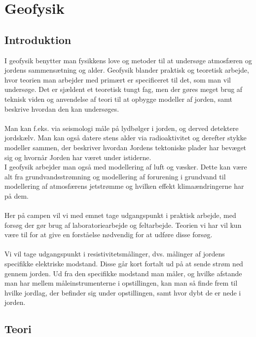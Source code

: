 \chapter{Geofysik}

\section{Introduktion}
I geofysik benytter man fysikkens love og metoder til at undersøge atmosfæren og jordens sammensætning og alder. Geofysik blander praktisk og teoretisk arbejde, hvor teorien man arbejder med primært er specificeret til det, som man vil undersøge. Det er sjældent et teoretisk tungt fag, men der gøres meget brug af teknisk viden og anvendelse af teori til at opbygge modeller af jorden, samt beskrive hvordan den kan undersøges.\\ \\
%
%
Man kan f.eks. via seismologi måle på lydbølger i jorden, og derved detektere jordskælv. Man kan også datere stens alder via radioaktivitet og derefter stykke modeller sammen, der beskriver hvordan Jordens tektoniske plader har bevæget sig og hvornår Jorden har været under istiderne.\\
%
I geofysik arbejder man også med modellering af luft og væsker. Dette kan være alt fra grundvandsstrømning og modellering af forurening i grundvand til modellering af atmosfærens jetstrømme og hvilken effekt klimaændringerne har på dem. \\ \\
%
%
Her på campen vil vi med emnet tage udgangspunkt i praktisk arbejde, med forsøg der gør brug af laboratoriearbejde og feltarbejde. Teorien vi har vil kun være til for at give en forståelse nødvendig for at udføre disse forsøg. \\ \\
%
%
Vi vil tage udgangspunkt i resistivitetsmålinger, dvs. målinger af jordens specifikke elektriske modstand. Disse går kort fortalt ud på at sende strøm ned gennem jorden. Ud fra den specifikke modstand man måler, og hvilke afstande man har mellem måleinstrumenterne i opstillingen, kan man så finde frem til hvilke jordlag, der befinder sig under opstillingen, samt hvor dybt de er nede i jorden.

\section{Teori}

